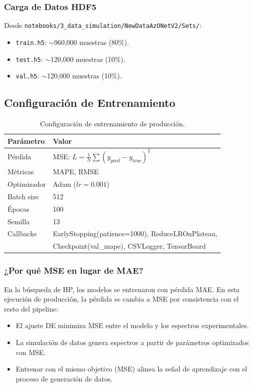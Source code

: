 \documentclass{article}
\begin{document}
\subsubsection{Carga de Datos HDF5}
Desde \texttt{notebooks/3\_data\_simulation/NewDataAzONetV2/Sets/}:
\begin{itemize}
\item \texttt{train.h5}: $\sim$960,000 muestras (80\%).
\item \texttt{test.h5}: $\sim$120,000 muestras (10\%).
\item \texttt{val.h5}: $\sim$120,000 muestras (10\%).
\end{itemize}

\subsection{Configuración de Entrenamiento}

\begin{table}[htbp]
\centering
\caption{Configuración de entrenamiento de producción.}
\label{tab:train-config}
\begin{tabular}{ll}
\hline
Parámetro & Valor \\
\hline
Pérdida & MSE: $L = \frac{1}{N} \sum (y_{\text{pred}} - y_{\text{true}})^2$ \\
Métricas & MAPE, RMSE \\
Optimizador & Adam ($lr=0.001$) \\
Batch size & 512 \\
Épocas & 100 \\
Semilla & 13 \\
Callbacks & EarlyStopping(patience=1000), ReduceLROnPlateau, \\
 & Checkpoint(val\_mape), CSVLogger, TensorBoard \\
\hline
\end{tabular}
\end{table}

\subsubsection{¿Por qué MSE en lugar de MAE?}
En la búsqueda de HP, los modelos se entrenaron con pérdida MAE. En esta ejecución de producción, la pérdida se cambia a MSE por consistencia con el resto del pipeline:
\begin{itemize}
\item El ajuste DE minimiza MSE entre el modelo y los espectros experimentales.
\item La simulación de datos genera espectros a partir de parámetros optimizados con MSE.
\item Entrenar con el mismo objetivo (MSE) alinea la señal de aprendizaje con el proceso de generación de datos.
\end{itemize}
\end{document}
